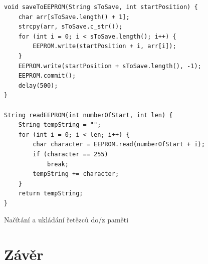 \documentclass[a4paper, 12pt]{report}
\begin{document}
    \begin{listing}[]
    \begin{verbatim}
void saveToEEPROM(String sToSave, int startPosition) {
    char arr[sToSave.length() + 1];
    strcpy(arr, sToSave.c_str());
    for (int i = 0; i < sToSave.length(); i++) {
        EEPROM.write(startPosition + i, arr[i]);
    }
    EEPROM.write(startPosition + sToSave.length(), -1);
    EEPROM.commit();
    delay(500);
}

String readEEPROM(int numberOfStart, int len) {
    String tempString = "";
    for (int i = 0; i < len; i++) {
        char character = EEPROM.read(numberOfStart + i);
        if (character == 255)
            break;
        tempString += character;
    }
    return tempString;
}
    \end{verbatim}
    \label{listing:eeprom}
    \caption{Načítání a ukládání řetězců do/z paměti}
    \end{listing}



    \chapter{Závěr}
    \renewcommand\listoflistingscaption{Seznam úryvků kódu}
    \listoflistings
    \listoftables

    \listoffigures

    
    

%
%
%
%
\end{document}
